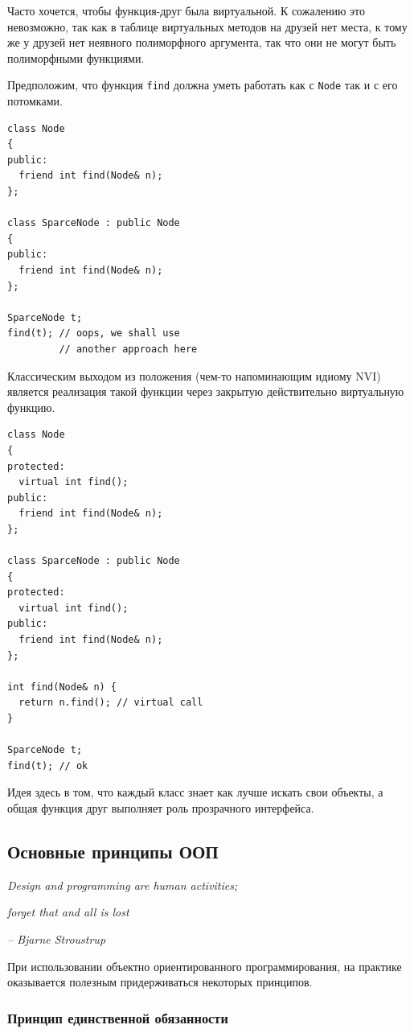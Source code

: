\documentclass[a4paper,12pt,oneside]{article}
\begin{document}
Часто хочется, чтобы функция-друг была виртуальной. К сожалению это невозможно, так как в таблице виртуальных методов на друзей нет места, к тому же у друзей нет неявного полиморфного аргумента, так что они не могут быть полиморфными функциями.

Предположим, что функция \lstinline!find! должна уметь работать как с \lstinline!Node! так и с его потомками.

\begin{lstlisting}
class Node
{
public:
  friend int find(Node& n);
};

class SparceNode : public Node
{
public:
  friend int find(Node& n);
};

SparceNode t;
find(t); // oops, we shall use 
         // another approach here
\end{lstlisting}

Классическим выходом из положения (чем-то напоминающим идиому NVI) является реализация такой функции через закрытую действительно виртуальную функцию.

\begin{lstlisting}
class Node
{
protected:
  virtual int find();
public:
  friend int find(Node& n);
};

class SparceNode : public Node
{
protected:
  virtual int find();
public:
  friend int find(Node& n);
};

int find(Node& n) {
  return n.find(); // virtual call
}

SparceNode t;
find(t); // ok
\end{lstlisting}

Идея здесь в том, что каждый класс знает как лучше искать свои объекты, а общая функция друг выполняет роль прозрачного интерфейса.

\pagebreak
\subsection{Основные принципы ООП}\label{SOLID}

\hfill\textit{Design and programming are human activities;}

\hfill\textit{forget that and all is lost}{\vspace{0.5em}}

\hfill\textit{-- Bjarne Stroustrup}

При использовании объектно ориентированного программирования, на практике оказывается полезным придерживаться некоторых принципов.

\subsubsection{Принцип единственной обязанности}\label{SRP}
\end{document}
